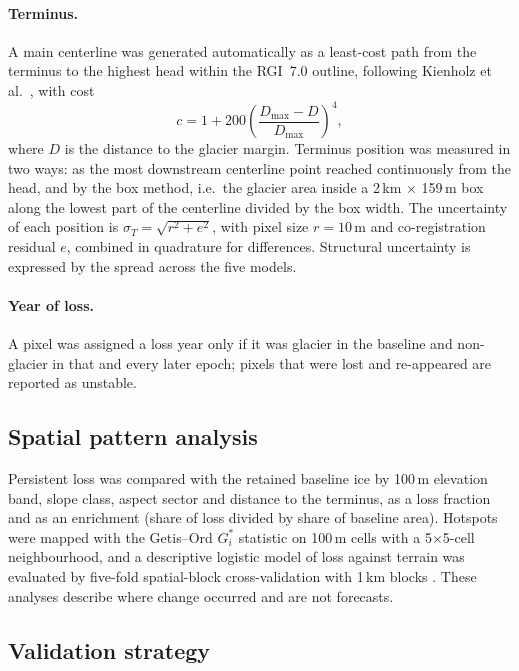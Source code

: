\documentclass[pdflatex,sn-mathphys-num]{sn-jnl}%
\theoremstyle{thmstyleone}%
\theoremstyle{thmstyletwo}%
\theoremstyle{thmstylethree}%
\begin{document}
\paragraph{Terminus.} A main centerline was generated automatically as a least-cost path from the terminus to the highest head within the RGI~7.0 outline, following Kienholz et al.\ \cite{kienholz2014}, with cost
\begin{equation}
c = 1 + 200\left(\frac{D_\mathrm{max} - D}{D_\mathrm{max}}\right)^{4},\label{eq:cost}
\end{equation}
where $D$ is the distance to the glacier margin. Terminus position was measured in two ways: as the most downstream centerline point reached continuously from the head, and by the box method, i.e.\ the glacier area inside a 2\,km $\times$ 159\,m box along the lowest part of the centerline divided by the box width. The uncertainty of each position is $\sigma_T = \sqrt{r^2 + e^2}$, with pixel size $r = 10$\,m and co-registration residual $e$, combined in quadrature for differences. Structural uncertainty is expressed by the spread across the five models.

\paragraph{Year of loss.} A pixel was assigned a loss year only if it was glacier in the baseline and non-glacier in that and every later epoch; pixels that were lost and re-appeared are reported as unstable.

\subsection{Spatial pattern analysis}\label{subsec3.9}

Persistent loss was compared with the retained baseline ice by 100\,m elevation band, slope class, aspect sector and distance to the terminus, as a loss fraction and as an enrichment (share of loss divided by share of baseline area). Hotspots were mapped with the Getis--Ord $G_i^*$ statistic \cite{getis1992,ord1995} on 100\,m cells with a 5$\times$5-cell neighbourhood, and a descriptive logistic model of loss against terrain was evaluated by five-fold spatial-block cross-validation with 1\,km blocks \cite{roberts2017}. These analyses describe where change occurred and are not forecasts.

\subsection{Validation strategy}\label{subsec3.10}
\end{document}
